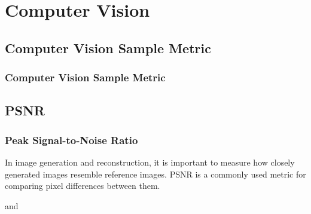 \chapter{Computer Vision}


\clearpage
\thispagestyle{cvstyle}
\section{Computer Vision Sample Metric}
\subsection{Computer Vision Sample Metric}


\clearpage
\thispagestyle{cvstyle}
\section{PSNR}
\subsection{Peak Signal-to-Noise Ratio}

In image generation and reconstruction, it is important to measure how closely generated images resemble reference images. 
PSNR is a commonly used metric for comparing pixel differences between them.

\begin{center}
\end{center}

\vspace{-10pt} 

and 

\vspace{-10pt}

